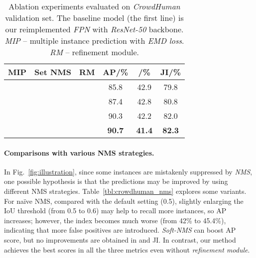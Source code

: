 \documentclass[10pt,twocolumn,letterpaper]{article}
\begin{document}
\begin{table}[ht]
	\centering
	\begin{tabular}{ccc|ccc}
		\toprule
		  MIP & Set NMS & RM & AP/\% & /\%  & JI/\% \\
		\hline
		 & & & 85.8 & 42.9 & 79.8 \\
		\hline 
		\checkmark & & & 87.4 & 42.8 &  80.8  \\
		\checkmark & \checkmark &  & 90.3 & 42.2 &  82.0  \\
		\checkmark & \checkmark & \checkmark & \textbf{90.7} & \textbf{41.4} &  \textbf{82.3}  \\
		\bottomrule
	\end{tabular}
	\caption{ Ablation experiments evaluated on \emph{CrowdHuman} validation set. The baseline model (the first line) is our reimplemented \emph{FPN} \cite{lin2017feature} with \emph{ResNet-50} \cite{he2016deep} backbone. \emph{MIP} -- multiple instance prediction with \emph{EMD loss}. \emph{RM} -- refinement module.  }
	\label{tbl:crowd_ablation}
\end{table}

\paragraph{Comparisons with various NMS strategies. }
In Fig.~\ref{fig:illustration}, since some instances are mistakenly suppressed by \emph{NMS}, one possible hypothesis is that the predictions may be improved by using different NMS strategies. Table~\ref{tbl:crowdhuman_nms} explores some variants. For na\"ive NMS, compared with the default setting (0.5), slightly enlarging the IoU threshold (from 0.5 to 0.6) may help to recall more instances, so AP increases; however, the  index becomes much worse (from 42\% to 45.4\%), indicating that more false positives are introduced. \emph{Soft-NMS} \cite{softnms} can boost AP score, but no improvements are obtained in  and JI. In contrast, our method achieves the best scores in all the three metrics even without \emph{refinement module}. 
\end{document}
